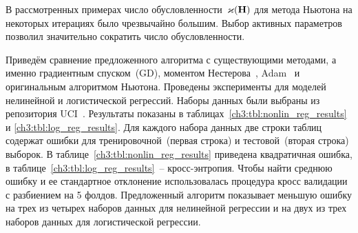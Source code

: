 В рассмотренных примерах число обусловленности~$\varkappa(\mathbf{H})$ для метода Ньютона на некоторых итерациях было чрезвычайно большим. 
Выбор активных параметров позволил значительно сократить число обусловленности. 

Приведём сравнение предложенного алгоритма с существующими методами, а именно градиентным спуском~(GD), моментом Нестерова~\cite{nesterov1983momentum}, Adam~\cite{kingma2014adam} и оригинальным алгоритмом Ньютона. 
Проведены эксперименты для моделей нелинейной и логистической регрессий. 
Наборы данных были выбраны из репозитория UCI~\cite{uci2017}. 
Результаты показаны в таблицах~\ref{ch3:tbl:nonlin_reg_results} и \ref{ch3:tbl:log_reg_results}. 
Для каждого набора данных две строки таблиц содержат ошибки для тренировочной~(первая строка) и тестовой~(вторая строка) выборок. 
В таблице~\ref{ch3:tbl:nonlin_reg_results} приведена квадратичная ошибка, в таблице~\ref{ch3:tbl:log_reg_results}~-- кросс-энтропия.
Чтобы найти среднюю ошибку и ее стандартное отклонение использовалась процедура кросс валидации с разбиением на 5 фолдов. 
Предложенный алгоритм показывает меньшую ошибку на трех из четырех наборов данных для нелинейной регрессии и на двух из трех наборов данных для логистической регрессии.

